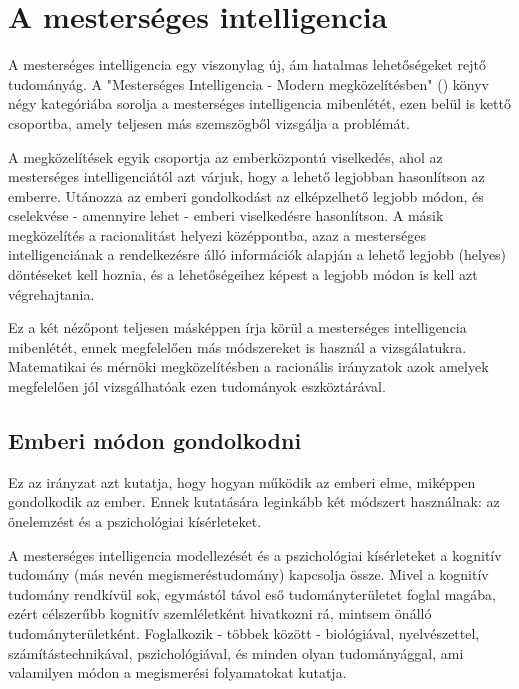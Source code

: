 \label{Chap:tema}

\section {A mesterséges intelligencia}
A mesterséges intelligencia egy viszonylag új, ám hatalmas lehetőségeket rejtő tudományág. A "Mesterséges Intelligencia - Modern megközelítésben" (\cite{bibref:mi_modern}) könyv négy kategóriába sorolja a mesterséges intelligencia mibenlétét, ezen belül is kettő csoportba, amely teljesen más szemszögből vizsgálja a problémát.\ujsor

A megközelítések egyik csoportja az emberközpontú viselkedés, ahol az mesterséges intelligenciától azt várjuk, hogy a lehető legjobban hasonlítson az emberre. Utánozza az emberi gondolkodást az elképzelhető legjobb módon, és cselekvése - amennyire lehet - emberi viselkedésre hasonlítson. A másik megközelítés a racionalitást helyezi középpontba, azaz a mesterséges intelligenciának a rendelkezésre álló információk alapján a lehető legjobb (helyes) döntéseket kell hoznia, és a lehetőségeihez képest a legjobb módon is kell azt végrehajtania. \ujsor

Ez a két nézőpont teljesen másképpen írja körül a mesterséges intelligencia mibenlétét, ennek megfelelően más módszereket is használ a vizsgálatukra. Matematikai és mérnöki megközelítésben a racionális irányzatok azok amelyek megfelelően jól vizsgálhatóak ezen tudományok eszköztárával.\ujsor

\subsection{Emberi módon gondolkodni}
Ez az irányzat azt kutatja, hogy hogyan működik az emberi elme, miképpen gondolkodik az ember. Ennek kutatására leginkább két módszert használnak: az önelemzést és a pszichológiai kísérleteket.\ujsor

A mesterséges intelligencia modellezését és a pszichológiai kísérleteket a kognitív tudomány (más nevén megismeréstudomány) kapcsolja össze. Mivel a kognitív tudomány rendkívül sok, egymástól távol eső tudományterületet foglal magába, ezért célszerűbb kognitív szemléletként hivatkozni rá, mintsem önálló tudományterületként. Foglalkozik - többek között - biológiával, nyelvészettel, számítástechnikával, pszichológiával, és minden olyan tudományággal, ami valamilyen módon a megismerési folyamatokat kutatja.\ujsor

